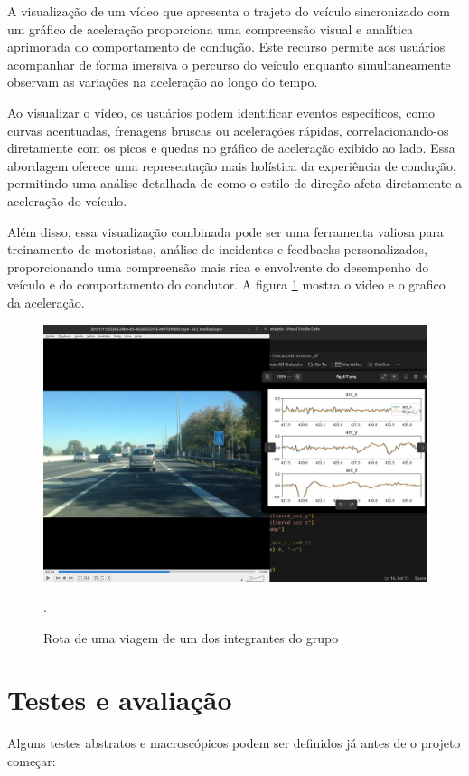 A visualização de um vídeo que apresenta o trajeto do veículo sincronizado com um gráfico de aceleração proporciona uma compreensão visual e analítica aprimorada do comportamento de condução. Este recurso permite aos usuários acompanhar de forma imersiva o percurso do veículo enquanto simultaneamente observam as variações na aceleração ao longo do tempo. 

Ao visualizar o vídeo, os usuários podem identificar eventos específicos, como curvas acentuadas, frenagens bruscas ou acelerações rápidas, correlacionando-os diretamente com os picos e quedas no gráfico de aceleração exibido ao lado. Essa abordagem oferece uma representação mais holística da experiência de condução, permitindo uma análise detalhada de como o estilo de direção afeta diretamente a aceleração do veículo. 

Além disso, essa visualização combinada pode ser uma ferramenta valiosa para treinamento de motoristas, análise de incidentes e feedbacks personalizados, proporcionando uma compreensão mais rica e envolvente do desempenho do veículo e do comportamento do condutor.
A figura \ref{fig:rota1integrante} mostra o video e o grafico da aceleração.

\begin{figure}[hp]
    \centering
    
    \includegraphics[scale=0.3]{figures/rota_integrante.jpg}
    
    \caption{Rota de uma viagem de um dos integrantes do grupo}.
    \label{fig:rota1integrante}
\end{figure}

\section{Testes e avaliação}
Alguns testes abstratos e macroscópicos podem ser definidos já antes de o projeto começar:

